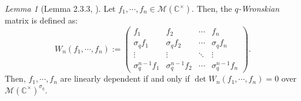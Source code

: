 \documentclass[a4paper]{report}
\theoremstyle{theorem}
\theoremstyle{definition}
\theoremstyle{remark}
\theoremstyle{proposition}
\theoremstyle{conjecture}
\theoremstyle{lemma}
\newtheorem{lemma}{Lemma}
\theoremstyle{corollary}
\theoremstyle{exercise}
\theoremstyle{example}
\newcommand{\C}{\mathbb{C}}
\newcommand{\mcal}{\mathcal}
\begin{document}
  \begin{lemma}[Lemma 2.3.3, \cite{sau16}]
      Let $f_1,\cdots, f_n \in \mcal{M}(\C^\times)$. Then, the \emph{$q$-Wronskian}
      matrix is defined as:
      $$W_n(f_1,\cdots,f_n) := \begin{pmatrix}
          f_1 & f_2 & \cdots & f_n\\
          \sigma_qf_1 & \sigma_qf_2 & \cdots & \sigma_qf_n\\
          \vdots & \vdots & \ddots & \vdots\\
          \sigma_q^{n-1} f_1 & \sigma_q^{n-1}f_2 & \cdots & \sigma_q^{n-1}f_n
      \end{pmatrix}.$$
      Then, $f_1,\cdots,f_n$ are linearly dependent if and only if 
      $\det W_n(f_1,\cdots,f_n) = 0$ over $\mcal{M}(\C^\times)^{\sigma_q}$.
  \end{lemma}
  
\end{document}
